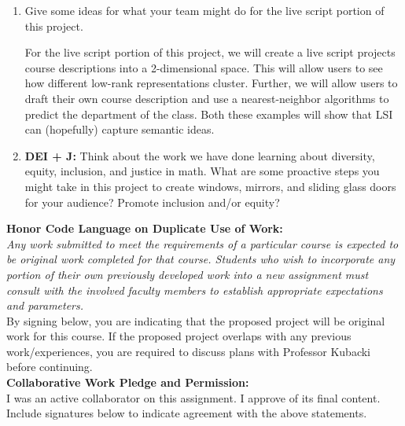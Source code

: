 \documentclass[11pt]{article}
\begin{document}
\begin{enumerate}
	\item Give some ideas for what your team might do for the live script portion of this project.

    For the live script portion of this project, we will create a live script projects course descriptions into a 2-dimensional space.
    This will allow users to see how different low-rank representations cluster.
    Further, we will allow users to draft their own course description and use a nearest-neighbor algorithms to predict the department of the class.
    Both these examples will show that LSI can (hopefully) capture semantic ideas.

	\item \textbf{DEI + J:}  Think about the work we have done learning about diversity, equity, inclusion, and justice in math. 
    What are some proactive steps you might take in this project to create windows, mirrors, and sliding glass doors for your audience?
    Promote inclusion and/or equity?
\end{enumerate}
	\begin{framed}
		\noindent \textbf{Honor Code Language on Duplicate Use of Work:}\\  \textit{Any work submitted to meet the requirements of a particular course is expected to be original work completed for that course. Students who wish to incorporate any portion of their own previously developed work into a new assignment must consult with the involved faculty members to establish appropriate expectations and parameters.} \\
		
		By signing below, you are indicating that the proposed project will be original work for this course.  If the proposed project overlaps with any previous work/experiences, you are required to discuss plans with Professor Kubacki before continuing.\\
		
		\noindent \textbf{Collaborative Work Pledge and Permission:}\\ I was an active collaborator on this assignment.  I approve of its final content.\\
		
		Include signatures below to indicate agreement with the above statements.
		\vspace{1.5in}
	\end{framed}
	\nocite{*}
	
\end{document}
